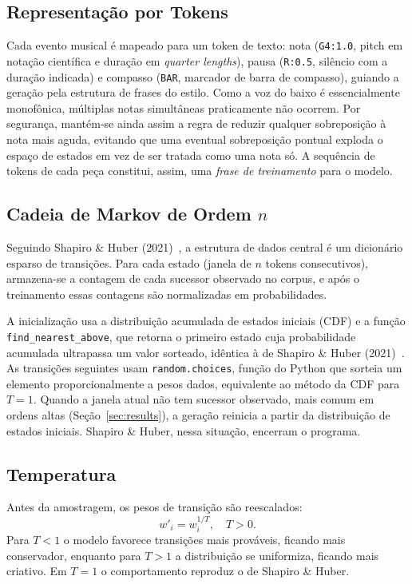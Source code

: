\documentclass{article}
\begin{document}
\subsection{Representação por Tokens}

Cada evento musical é mapeado para um token de texto: nota (\texttt{G4:1.0},
pitch em notação científica e duração em \emph{quarter lengths}), pausa
(\texttt{R:0.5}, silêncio com a duração indicada) e compasso (\texttt{BAR},
marcador de barra de compasso), guiando a geração pela estrutura de frases do
estilo. Como a voz do baixo é essencialmente monofônica, múltiplas notas
simultâneas praticamente não ocorrem. Por segurança, mantém-se ainda assim a
regra de reduzir qualquer sobreposição à nota mais aguda, evitando que uma
eventual sobreposição pontual exploda o espaço de estados em vez de ser tratada
como uma nota só. A sequência de tokens de cada peça constitui, assim, uma
\emph{frase de treinamento} para o modelo.

\subsection{Cadeia de Markov de Ordem $n$}

Seguindo Shapiro \& Huber (2021)~\cite{Shapiro2021:markov}, a estrutura de dados
central é um dicionário esparso de transições. Para cada estado (janela de $n$
tokens consecutivos), armazena-se a contagem de cada sucessor observado no
corpus, e após o treinamento essas contagens são normalizadas em probabilidades.

A inicialização usa a distribuição acumulada de estados iniciais (CDF) e a
função \texttt{find\_nearest\_above}, que retorna o primeiro estado cuja
probabilidade acumulada ultrapassa um valor sorteado, idêntica à de Shapiro \&
Huber (2021)~\cite{Shapiro2021:markov}. As transições seguintes usam
\texttt{random.choices}, função do Python que sorteia um elemento
proporcionalmente a pesos dados, equivalente ao método da CDF para $T = 1$.
Quando a janela atual não tem sucessor observado, mais comum em ordens altas
(Seção~\ref{sec:results}), a geração reinicia a partir da distribuição de
estados iniciais. Shapiro \& Huber, nessa situação, encerram o programa.

\subsection{Temperatura}

Antes da amostragem, os pesos de transição são reescalados:
\begin{equation}
  w'_i = w_i^{1/T}, \quad T > 0.
  \label{eq:temperature}
\end{equation}
Para $T < 1$ o modelo favorece transições mais prováveis, ficando mais
conservador, enquanto para $T > 1$ a distribuição se uniformiza, ficando mais
criativo. Em $T = 1$ o comportamento reproduz o de Shapiro \& Huber.
\end{document}

